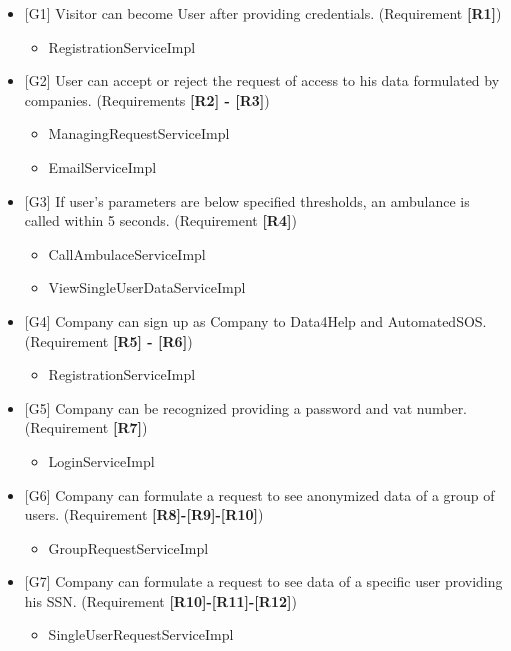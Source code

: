 \documentclass{article}
\begin{document}
\begin{itemize}
	\item {[G1]} Visitor can become User after providing credentials. (Requirement \textbf{[R1]})
	\begin{itemize}
	\item RegistrationServiceImpl
	\end{itemize}
	\item {[G2]} User can accept or reject the request of access to his data formulated by companies. (Requirements \textbf{[R2] - [R3]})
	\begin{itemize}
	\item ManagingRequestServiceImpl
	\item EmailServiceImpl
	\end{itemize}
	\item {[G3]} If user's parameters are below specified thresholds, an ambulance is called within 5 seconds. (Requirement \textbf{[R4]}) 
	\begin{itemize}
	\item CallAmbulaceServiceImpl
	\item ViewSingleUserDataServiceImpl
	\end{itemize}
	\item {[G4]} Company can sign up as Company to Data4Help and AutomatedSOS. (Requirement \textbf{[R5] - [R6]})
	\begin{itemize}
	\item RegistrationServiceImpl
	\end{itemize}
	\item {[G5]} Company can be recognized providing a password and vat number. (Requirement \textbf{[R7]})
	\begin{itemize}
	\item LoginServiceImpl
	\end{itemize}
	\item {[G6]} Company can formulate a request to see anonymized data of a group of users. (Requirement \textbf{[R8]-[R9]-[R10]})
	\begin{itemize}
	\item GroupRequestServiceImpl
	\end{itemize}
	\item {[G7]} Company can formulate a request to see data of a specific user providing his SSN. (Requirement \textbf{[R10]-[R11]-[R12]})
	\begin{itemize}
	\item SingleUserRequestServiceImpl
	\end{itemize}

\end{itemize}
\end{document}
